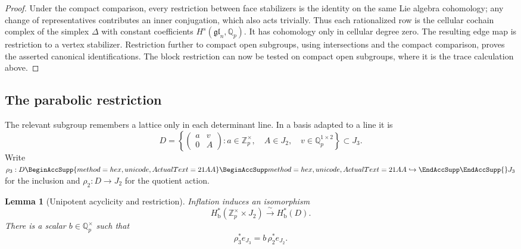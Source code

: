 \documentclass[11pt]{article}
\numberwithin{equation}{section}
\newtheorem{lemma}[theorem]{Lemma}
\theoremstyle{definition}
\theoremstyle{remark}
\newcommand{\Q}{\mathbb Q}
\newcommand{\Z}{\mathbb Z}
\let\UnicodeOriginalHookrightarrow\hookrightarrow
\DeclareRobustCommand{\hookrightarrow}{
  \BeginAccSupp{method=hex,unicode,ActualText=21AA}
  \UnicodeOriginalHookrightarrow\EndAccSupp{}}
\begin{document}
\begin{proof}
Under the compact comparison, every restriction between face
stabilizers is the identity on the same Lie algebra cohomology;
any change of representatives contributes an inner conjugation,
which also acts trivially.  Thus each rationalized row is the
cellular cochain complex of the simplex $\Delta$ with constant
coefficients $H^s(\mathfrak{gl}_n,\Q_p)$.
It has cohomology only in cellular degree zero.
The resulting edge map is restriction to a vertex stabilizer.
Restriction further to compact open subgroups, using intersections
and the compact comparison, proves the asserted canonical
identifications.  The block restriction can now be tested on
compact open subgroups, where it is the trace calculation above.
\end{proof}

\subsection{The parabolic restriction}

The relevant subgroup remembers a lattice only in each determinant
line.  In a basis adapted to a line it is
\[
 D=\left\{
 \begin{pmatrix}a&v\\0&A\end{pmatrix}:
 a\in\Z_p^\times,\quad A\in J_2,\quad
 v\in\Q_p^{1\times2}\right\}\subset J_3.
\]
Write $\rho_3:D\hookrightarrow J_3$ for the inclusion and
$\rho_2:D\to J_2$ for the quotient action.

\begin{lemma}[Unipotent acyclicity and restriction]
\label{lem:parabolic}
Inflation induces an isomorphism
\[
 H^*_{\mathrm b}(\Z_p^\times\times J_2)
       \xrightarrow{\ \sim\ }H^*_{\mathrm b}(D).
\]
There is a scalar $b\in\Q_p^\times$ such that
\[
 \rho_3^*e_{J_3}=b\,\rho_2^*e_{J_2}.
\]
\end{lemma}
\end{document}
